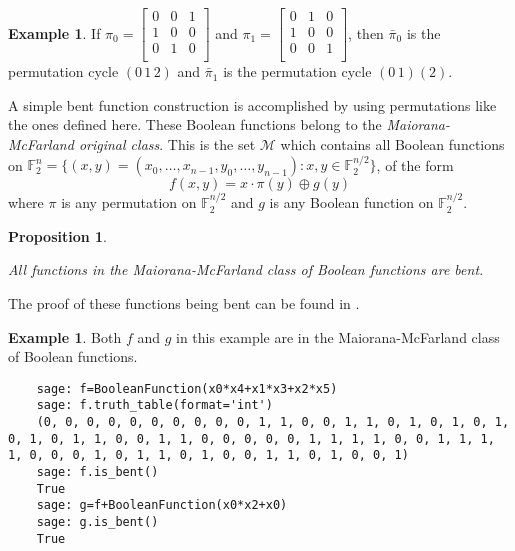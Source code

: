 \documentclass[english]{article}
\def\gftwo{\mathbb{F}_2}
\theoremstyle{plain}
\newtheorem{proposition}[theorem]{Proposition}%
\theoremstyle{definition}
\newtheorem{example}[theorem]{Example}
\theoremstyle{remark}
\begin{document}
\begin{example}
  If $\pi_0=\begin{bmatrix}
               0&0&1\\
               1&0&0\\
               0&1&0\\
             \end{bmatrix}$ and $\pi_1=
             \begin{bmatrix}
               0&1&0\\
               1&0&0\\
               0&0&1\\
             \end{bmatrix}$, then $\bar{\pi}_0$ is the permutation cycle $(0\,1\,2)$
             and $\bar{\pi}_1$ is the permutation cycle $(0\,1)(2)$.
\end{example}
\par A simple bent function construction is accomplished by using permutations
like the ones defined here. These Boolean functions belong to the {\it
Maiorana-McFarland original class}. This is the set
$\mathcal{M}$ which contains all Boolean functions on
$\gftwo^n=\{(x,y)=(x_0,\dots,x_{n-1},y_0,\dots,y_{n-1}):x,y\in\gftwo^{n/2}\}$, of the form
  \[
  f(x,y)=x\cdot\pi(y)\oplus g(y)
  \]
where $\pi$ is any permutation on $\gftwo^{n/2}$ and $g$ is any Boolean
function on $\gftwo^{n/2}$.

\begin{proposition}{\rm\cite{col:c06}}
\par All functions in the Maiorana-McFarland class of Boolean functions are
bent.
\end{proposition}
\par The proof of these functions being bent can be found in \cite{col:c06}.


\begin{example}
  \par Both $f$ and $g$ in this example are in the Maiorana-McFarland class of
  Boolean functions.
  \begin{lstlisting}
    sage: f=BooleanFunction(x0*x4+x1*x3+x2*x5)
    sage: f.truth_table(format='int')
    (0, 0, 0, 0, 0, 0, 0, 0, 0, 0, 1, 1, 0, 0, 1, 1, 0, 1, 0, 1, 0, 1, 0, 1, 0, 1, 1, 0, 0, 1, 1, 0, 0, 0, 0, 0, 1, 1, 1, 1, 0, 0, 1, 1, 1, 1, 0, 0, 0, 1, 0, 1, 1, 0, 1, 0, 0, 1, 1, 0, 1, 0, 0, 1)
    sage: f.is_bent()
    True
    sage: g=f+BooleanFunction(x0*x2+x0)
    sage: g.is_bent()
    True
  \end{lstlisting}
\end{example}
\end{document}
